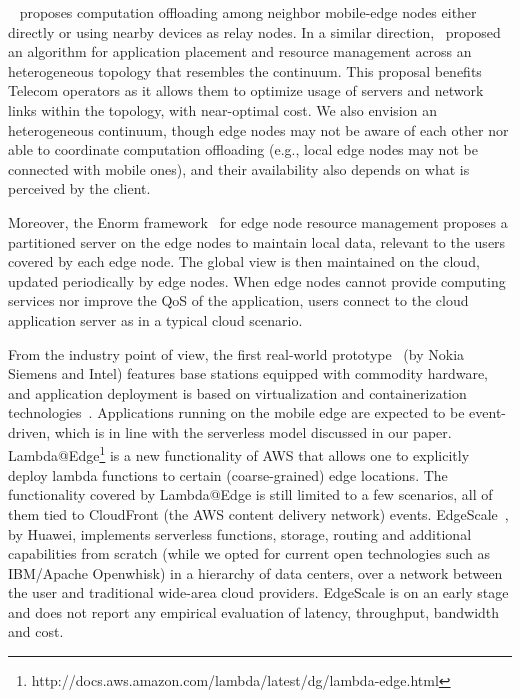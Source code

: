 
~\cite{Satria2017mec} proposes computation offloading among neighbor mobile-edge nodes either directly or using nearby devices as relay nodes. 
In a similar direction,~\cite{Tarneberg2017} proposed an algorithm for application placement and resource management across an heterogeneous topology that resembles the continuum. This proposal benefits Telecom operators as it allows them to optimize usage of servers and network links within the topology, with near-optimal cost. We also envision an heterogeneous continuum, though edge nodes may not be aware of each other nor able to coordinate computation offloading (e.g., local edge nodes may not be connected with mobile ones), and their availability also depends on what is perceived by the client. 

Moreover, the Enorm framework~\cite{wang2017enorm} for edge node resource management  proposes a partitioned server on the edge nodes to maintain local data, relevant to the users covered by each edge node. The global view is then maintained on the cloud, updated periodically by edge nodes. When edge nodes cannot provide computing services nor improve the QoS of the application, users connect to the cloud application server as in a typical cloud scenario.


From the industry point of view, the first real-world prototype~\cite{beck2014mobile} (by Nokia Siemens and Intel) features base stations equipped with commodity hardware, and application deployment is based on virtualization and containerization technologies~\cite{ismail2015icos}. Applications running on the mobile edge are expected to be event-driven, which is in line with the serverless model discussed in our paper. Lambda@Edge\footnote{http://docs.aws.amazon.com/lambda/latest/dg/lambda-edge.html} is a new functionality of AWS that allows one to explicitly deploy lambda functions to certain (coarse-grained) edge locations. The functionality covered by Lambda@Edge is still limited to a few scenarios, all of them tied to CloudFront (the AWS content delivery network) events. EdgeScale~\cite{Lara2016hierarchical}, by Huawei, implements serverless functions, storage, routing and additional capabilities from scratch (while we opted for current open technologies such as IBM/Apache Openwhisk) in a hierarchy of data centers, over a network between the user and traditional wide-area cloud providers. EdgeScale is on an early stage and does not report any empirical evaluation of latency, throughput, bandwidth and cost.


